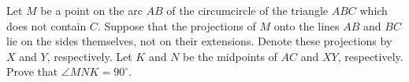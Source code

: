 Let $M$ be a point on the arc $AB$ of the circumcircle of the triangle $ABC$ which does not contain $C$. Suppose that the projections of $M$ onto the lines $AB$ and $BC$ lie on the sides themselves, not on their extensions. Denote these projections by $X$ and $Y$,  respectively. Let $K$ and $N$ be the midpoints of $AC$ and $XY$,  respectively. Prove that $\angle MNK=90^{\circ}$.